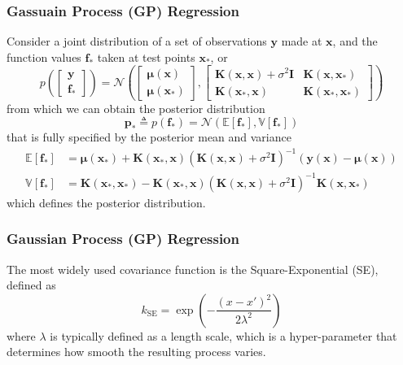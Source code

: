 \documentclass{beamer}
\begin{document}
\begin{frame}
    \frametitle{Gassuain Process (GP) Regression}
    Consider a joint distribution of a set of observations $\mathbf{y}$ made at $\mathbf{x}$, and the function values $\mathbf{f}_*$ taken at test points $\mathbf{x}_*$, or
    \begin{equation*}
        p  \left(
        \begin{bmatrix}
            \mathbf{y} \\
            \mathbf{f}_*
        \end{bmatrix}
        \right) = \mathcal{N}
            \left(
            \begin{bmatrix}
                \bm{\mu} (\mathbf{x}) \\
                \bm{\mu} (\mathbf{x}_*)
            \end{bmatrix},
            	\begin{bmatrix}
            		\mathbf{K} (\mathbf{x}, \mathbf{x}) + \sigma^2 \mathbf{I}&
            		\mathbf{K} (\mathbf{x}, \mathbf{x}_*) \\
            		\mathbf{K} (\mathbf{x}_*, \mathbf{x}) &
            		\mathbf{K} (\mathbf{x}_*, \mathbf{x}_*)
            	\end{bmatrix}
            \right)
    \end{equation*}
    from which we can obtain the posterior distribution
    \begin{equation*}
        \bm{p}_* \triangleq p (\mathbf{f}_*) = \mathcal{N} (\mathbb{E}[\mathbf{f}_*], \mathbb{V} [\mathbf{f}_*])
    \end{equation*}
    that is fully specified by the posterior mean and variance
    \begin{align*}
        \mathbb{E}[\mathbf{f}_*] &= \bm{\mu}(\mathbf{x}_*) + 	\mathbf{K} (\mathbf{x}_*, \mathbf{x}) \left( \mathbf{K} (\mathbf{x}, \mathbf{x}) + \sigma^2 \mathbf{I} \right)^{-1} (\mathbf{y}(\mathbf{x}) - \bm{\mu}(\mathbf{x})) \\
        \mathbb{V} [\mathbf{f}_*] &= \mathbf{K} (\mathbf{x}_*, \mathbf{x}_*) - \mathbf{K} (\mathbf{x}_*, \mathbf{x}) \left( \mathbf{K} (\mathbf{x}, \mathbf{x}) + \sigma^2 \mathbf{I} \right)^{-1} \mathbf{K} (\mathbf{x}, \mathbf{x}_*)
    \end{align*}
    which defines the posterior distribution.
\end{frame}

\begin{frame}
    \frametitle{Gaussian Process (GP) Regression}
    The most widely used covariance function is the Square-Exponential (SE), defined as
    \begin{equation*}
        k_\mathrm{SE} = \exp \left( - \frac{(x - x')^2}{2 \lambda^2} \right)
    \end{equation*}
    where $\lambda$ is typically defined as a length scale, which is a hyper-parameter that determines how smooth the resulting process varies.
\end{frame}
\end{document}

